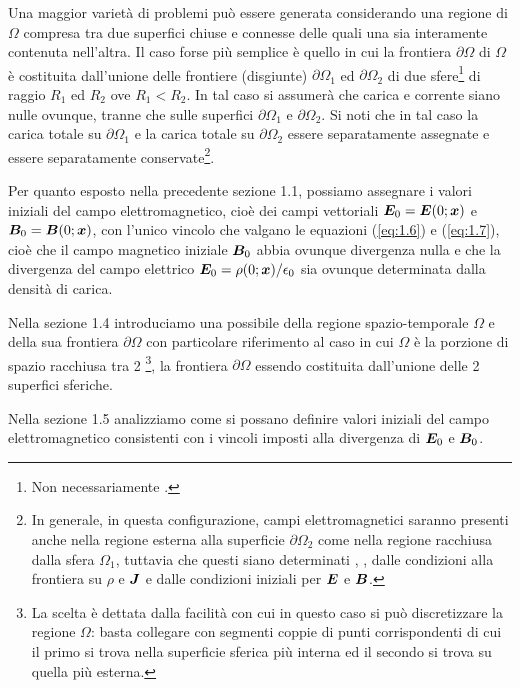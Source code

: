 Una maggior varietà di problemi può essere generata considerando una regione di  $\Omega$ compresa tra due superfici chiuse e connesse delle quali una sia interamente contenuta nell'altra. Il caso forse più semplice è quello in cui la frontiera $\partial \Omega$ di $\Omega$ è costituita dall'unione delle frontiere (disgiunte) $\partial \Omega_1$ ed $\partial \Omega_2$ di due sfere\footnote{Non necessariamente .} di raggio $R_1$ ed $R_2$ ove $R_1 < R_2$. In tal caso si assumerà che carica e corrente siano nulle ovunque, tranne che sulle superfici $\partial \Omega_1$ e $\partial \Omega_2$. Si noti che in tal caso la carica totale su $\partial \Omega_1$ e la carica totale su $\partial \Omega_2$  essere separatamente assegnate e  essere separatamente conservate\footnote{In generale, in questa configurazione, campi elettromagnetici saranno presenti anche nella regione esterna alla superficie $\partial \Omega_2$ come nella regione racchiusa dalla sfera $\Omega_1$, tuttavia  che questi siano determinati , , dalle condizioni alla frontiera su $\rho$ e $\vb*{J}$ e dalle condizioni iniziali per $\vb*{E}$ e $\vb*{B}$.}. 

Per quanto esposto nella precedente sezione 1.1, possiamo assegnare i valori iniziali del campo elettromagnetico, cioè dei campi vettoriali $\vb*{E}_0 = \vb*{E}(0; \vb*{x})$ e $\vb*{B}_0 = \vb*{B}(0; \vb*{x})$, con l'unico vincolo che valgano le equazioni (\ref{eq:1.6}) e (\ref{eq:1.7}), cioè che il campo magnetico iniziale $\vb*{B}_0$ abbia ovunque divergenza nulla e che la divergenza del campo elettrico $\vb*{E}_0 = \rho(0; \vb*{x})/\epsilon_0$ sia ovunque determinata dalla densità di carica. 

Nella sezione 1.4 introduciamo una possibile  della regione spazio-temporale $\Omega$ e della sua frontiera $\partial \Omega$ con particolare riferimento al caso in cui $\Omega$ è la porzione di spazio racchiusa tra 2 \footnote{La scelta è dettata dalla facilità con cui in questo caso si può discretizzare la regione $\Omega$: basta collegare con segmenti  coppie di punti corrispondenti di cui il primo si trova nella superficie sferica più interna ed il secondo si trova su quella più esterna.}, la frontiera $\partial \Omega$ essendo costituita dall'unione delle 2 superfici sferiche. 

Nella sezione 1.5 analizziamo come si possano definire valori iniziali del campo elettromagnetico consistenti con i vincoli imposti alla divergenza di $\vb*{E}_0$ e $\vb*{B}_0$.


